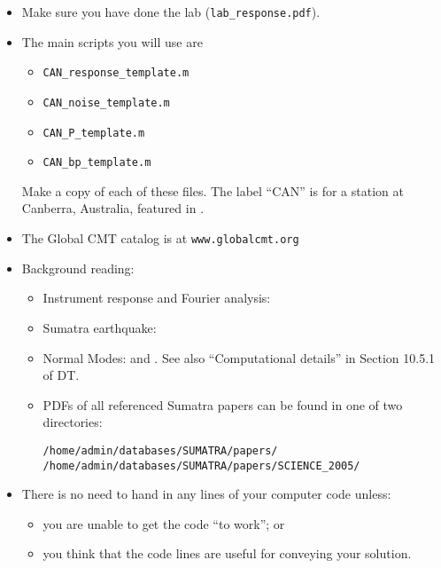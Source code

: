 \documentclass[11pt,titlepage,fleqn]{article}
\begin{document}
\begin{itemize}

\item Make sure you have done the lab (\verb+lab_response.pdf+).


\item The main scripts you will use are
%
\begin{itemize}
\item \verb+CAN_response_template.m+
\item \verb+CAN_noise_template.m+
\item \verb+CAN_P_template.m+
\item \verb+CAN_bp_template.m+
\end{itemize}
%
Make a copy of each of these files. The label ``CAN'' is for a station at Canberra, Australia, featured in \citet[][Figure~1]{Park2005}.


\item The Global CMT catalog is at \verb+www.globalcmt.org+


\item Background reading:

\begin{itemize}
\item Instrument response and Fourier analysis: \citet[][Ch.~6]{SteinWysession}
\item Sumatra earthquake: \citep{Lay2005,Ammon2005,Park2005}
\item Normal Modes: \citet[][Section 2.9]{SteinWysession} and \citet[][Ch.~8]{DT}. See also ``Computational details'' in Section 10.5.1 of DT.
\item PDFs of all referenced Sumatra papers can be found in one of two directories:

\begin{verbatim}
/home/admin/databases/SUMATRA/papers/
/home/admin/databases/SUMATRA/papers/SCIENCE_2005/
\end{verbatim}

\end{itemize}


\item There is no need to hand in any lines of your computer code unless:
%
\begin{itemize}
\item you are unable to get the code ``to work''; or
\item you think that the code lines are useful for conveying your solution.
\end{itemize}

\end{itemize}
\end{document}
